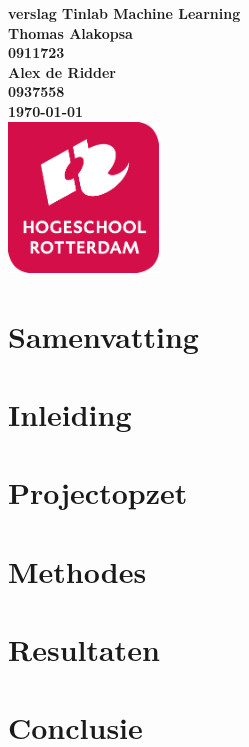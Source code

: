 \documentclass{article}
\begin{document}
\sffamily
\begin{titlepage}
  \centering
    \vfill
    {\bfseries\Huge
      verslag Tinlab Machine Learning \\
        \vskip2cm
      }
      {\bfseries\Large
      	Thomas Alakopsa\\
      	{ \bfseries\normalsize
      	0911723\\
      	}
      }
      {\bfseries\Large
      	Alex de Ridder\\
      	{ \bfseries\normalsize
      	0937558\\
      	}
      }
      {
        \bfseries\normalsize
        \vskip1cm
        \today\\
    }    
    \vfill
    \includegraphics[width=4cm]{logohr.png}
    \vfill
    \vfill
\end{titlepage}
\newpage

\section{Samenvatting}



\section{Inleiding}

\section{Projectopzet}



\section{Methodes}

\section{Resultaten}

\section{Conclusie}

\newpage


\end{document}
